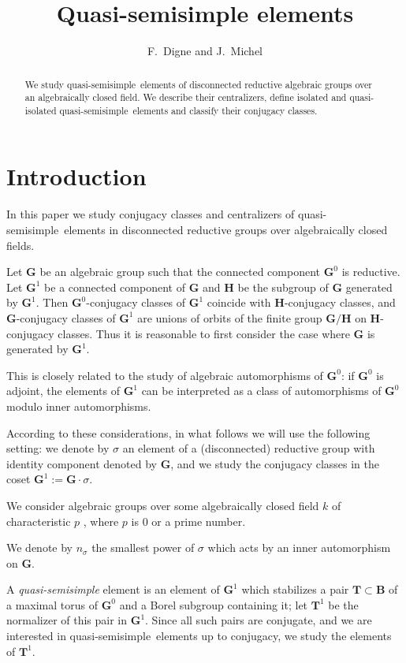 \documentclass{amsart}
\title{Quasi-semisimple elements}
\author{F.~Digne and J.~Michel}
\numberwithin{equation}{section}
\theoremstyle{definition}
\theoremstyle{remark}
\newcommand\bB{{\mathbf B}}
\newcommand\bG{{\mathbf G}}
\newcommand\bH{{\mathbf H}}
\newcommand\bT{{\mathbf T}}
\newcommand\Gun{{\bG^1}}
\newcommand\Tun{{\bT^1}}
\newcommand\qss{quasi-semisimple}
\begin{document}
\maketitle
\begin{abstract}
We study \qss\ elements of disconnected reductive algebraic groups
over an algebraically closed field. We describe their centralizers, 
define isolated and quasi-isolated \qss\ elements and classify their
conjugacy classes.
\end{abstract}
\section*{Introduction}
In this paper we study conjugacy classes and centralizers
of  \qss\  elements  in  disconnected  reductive  groups over algebraically
closed fields.

Let  $\bG$ be an algebraic group  such that the connected component $\bG^0$
is  reductive.  Let  $\Gun$
\index{G1@$\bG$, $\Gun$}
be  a  connected  component  of  $\bG$
and $\bH$  be the  subgroup of  $\bG$ generated by $\Gun$.
Then  $\bG^0$-conjugacy  classes  of  $\Gun$  coincide  with $\bH$-conjugacy
classes, and $\bG$-conjugacy classes of $\Gun$ are unions of 
orbits of the  finite  group  $\bG/\bH$ on $\bH$-conjugacy classes.
Thus it is reasonable to first consider the case where $\bG$ is generated by
$\Gun$.

This is  closely related  to the  study of algebraic automorphisms of
$\bG^0$:  if $\bG^0$ is  adjoint, the elements of $\Gun$ can be interpreted
as a class of automorphisms of $\bG^0$ modulo inner automorphisms.

According  to  these  considerations,  in  what  follows  we  will  use the
following  setting: we  denote by  $\sigma$ an  element of a (disconnected)
reductive  group with identity
component denoted by $\bG$, and  we  study  the  conjugacy
classes  in the coset $\Gun:=\bG\cdot\sigma$.

We  consider algebraic groups  over some algebraically  closed field $k$ of
characteristic $p$ , where $p$ is $0$ or a prime number.

We  denote  by $n_\sigma$ 
the smallest  power of  $\sigma$ which acts by an inner
automorphism on $\bG$.

A  {\em \qss} element is an element of  $\Gun$ which stabilizes a pair 
$\bT\subset\bB$ of a maximal torus of $\bG^0$ and a Borel subgroup containing
it;  let $\Tun$ \index{Tun@$\bT$, $\Tun$} be the normalizer
of  this pair  in $\Gun$.  
Since all such pairs are conjugate, and we are interested in \qss\ elements
up to conjugacy, we study the elements of $\Tun$.
\end{document}
